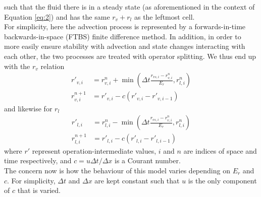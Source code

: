 \documentclass[11pt]{article}
\begin{document}
such that the fluid there is in a steady state (as aforementioned in the context of Equation \ref{eq:2}) and has the same $r_v+r_l$ as the leftmost cell. \\
For simplicity, here the advection process is represented by a forwards-in-time backwards-in-space (FTBS) finite difference method. In addition, in order to more easily ensure stability with advection and state changes interacting with each other, the two processes are treated with operator splitting. We thus end up with the $r_v$ relation
\begin{align} \label{eq:4}
r'_{v,i} &= r^n_{v,i} + \min\left(\Delta t\frac{r_{vs,i} - r^n_{v,i}}{E_r},r^n_{l,i}\right) \\ \label{eq:5}
r^{n+1}_{v,i} &= r'_{v,i} - c\left(r'_{v,i} - r'_{v,i-1}\right)
\end{align}
and likewise for $r_l$
\begin{align} \label{eq:6}
r'_{l,i} &= r^n_{l,i} - \min\left(\Delta t\frac{r_{vs,i} - r^n_{v,i}}{E_r},r^n_{l,i}\right) \\ \label{eq:7}
r^{n+1}_{l,i} &= r'_{l,i} - c\left(r'_{l,i} - r'_{l,i-1}\right)
\end{align}
where $r'$ represent operation-intermediate values, $i$ and $n$ are indices of space and time respectively, and $c=u \Delta t/\Delta x$ is a Courant number. \\
The concern now is how the behaviour of this model varies depending on $E_r$ and $c$. For simplicity, $\Delta t$ and $\Delta x$ are kept constant such that $u$ is the only component of $c$ that is varied.
\end{document}
